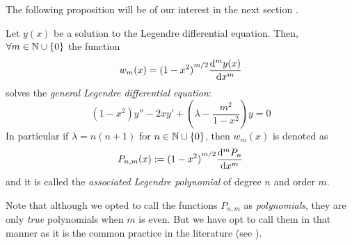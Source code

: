\documentclass[../main.tex]{subfiles}
\begin{document}
The following proposition will be of our interest in the next section \cite{mathematical_methods}.
\begin{proposition}\label{prop:associate_legendre}
  Let $y(x)$ be a solution to the Legendre differential equation. Then, $\forall m\in\mathbb{N}\cup\{0\}$ the function
  \begin{equation}
    w_m(x)={(1-x^2)}^{m/2} \dv[m]{y(x)}{x}
  \end{equation}
  solves the \emph{general Legendre differential equation}:
  \begin{equation}
    (1-x^2)y''-2xy'+\left(\lambda - \frac{m^2}{1-x^2}\right) y=0
  \end{equation}
  In particular if $\lambda=n(n+1)$ for $n\in\mathbb{N}\cup\{0\}$, then $w_m(x)$ is denoted as
  \begin{equation}\label{eq:associated_legendre_polynomials}
    P_{n,m}(x):={(1-x^2)}^{m/2} \dv[m]{P_n}{x}
  \end{equation}
  and it is called the \emph{associated Legendre polynomial} of degree $n$ and order $m$.
\end{proposition}
Note that although we opted to call the functions $P_{n,m}$ as \emph{polynomials}, they are only \emph{true} polynomials when $m$ is even. But we have opt to call them in that manner as it is the common practice in the literature (see \cite{wolfram_associated_legendre_polynomials,mathematical_methods,florida:legendre}).
\end{document}
